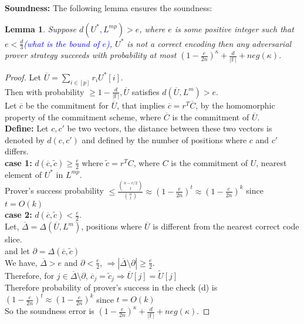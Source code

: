 \documentclass{article}
\newtheorem{lemma}[theorem]{Lemma}
\newcommand{\mycomment}[1] {\textcolor{blue}  {{\sl{#1}}}}
\begin{document}
\textbf{Soundness:} The following lemma ensures the soundness:
 \begin{lemma} Suppose $d(U^*,L^{mp})>e$, where $e$ is some positive integer such that $e<\frac{d}{3}$\mycomment{(what is the bound of $e$)}, $U^*$ is not a correct encoding then any adversarial prover strategy succeeds with probability at most $(1-\frac{e}{2n})^{\kappa}+\frac{d}{|\mathbb{F}|}+neg(\kappa)$.
 \end{lemma}
 
 \begin{proof}
 	Let $\overline{U}= \sum\limits_{i\in[p]}r_iU^{*}[i]$.\\
	Then with probability $\geq 1-\frac{d}{|\mathbb{F}|}, \overline{U}$ satisfies $d(\overline{U},L^m)>e$.\\
	Let $\overline{c}$ be the commitment for $\overline{U}$, that implies $\overline{c}=r^T\overline{C}$, by the homomorphic property of the commitment scheme, where $\overline{C}$ is the commitment of $\overline{U}$.\\
	\textbf{Define: } Let $c,c'$ be two vectors, the distance between these two vectors is denoted by $d(c,c')$ and defined by the number of positions where $c$ and $c'$ differs.\\
	\textbf{case 1:} $d(\overline{c},\tilde{c})\geq \frac{e}{2}$ where $\tilde{c}= r^TC$, where $C$ is the commitment of $U$, nearest element of $U^*$ in $L^{mp}$.\\
	Prover's success probability $\leq \frac{\binom{n-e/2}{t}}{\binom{n}{t}}\approx(1-\frac{e}{2n})^t\approx(1-\frac{e}{2n})^k$ since $t=O(k)$\\
	\textbf{case 2:} $d(\overline{c},\tilde{c})< \frac{e}{2}$.\\
	Let, $\overline{\Delta}=\Delta(\overline{U}, L^m)$, positions where $\overline{U}$ is different from the nearest correct code slice.\\
	and let $\partial=\Delta(\overline{c},\tilde{c})$\\
	We have, $\overline{\Delta}>e$ and $\partial<\frac{e}{2}$, 
	$\Rightarrow |\overline{\Delta}\setminus \partial| \geq \frac{e}{2}$.\\
	Therefore, for $j\in \overline{\Delta}\setminus \partial$, $\overline{c}_j=\tilde{c}_j \Rightarrow \overline{U}[j]=\widetilde{U}[j]$\\
	Therefore probability of prover's success in the check (d) is $(1-\frac{e}{2n})^t\approx(1-\frac{e}{2n})^k$ since $t=O(k)$\\
	So the soundness error is $(1-\frac{e}{2n})^{\kappa}+\frac{d}{|\mathbb{F}|}+neg(\kappa)$.
 \end{proof}
 
\end{document}
